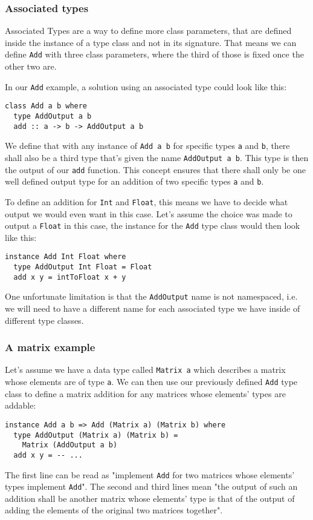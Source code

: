 
\subsubsection{Associated types}

Associated Types are a way to define more class parameters, that are defined inside the instance of a type class and not in its signature. That means we can define \verb|Add| with three class parameters, where the third of those is fixed once the other two are.

In our \verb|Add| example, a solution using an associated type could look like this:
\begin{verbatim}
class Add a b where
  type AddOutput a b
  add :: a -> b -> AddOutput a b
\end{verbatim}
We define that with any instance of \verb|Add a b| for specific types \verb|a| and \verb|b|, there shall also be a third type that's given the name \verb|AddOutput a b|. This type is then the output of our \verb|add| function. This concept ensures that there shall only be one well defined output type for an addition of two specific types \verb|a| and \verb|b|.

To define an addition for \verb|Int| and \verb|Float|, this means we have to decide what output we would even want in this case. Let's assume the choice was made to output a \verb|Float| in this case, the instance for the \verb|Add| type class would then look like this:
\begin{verbatim}
instance Add Int Float where
  type AddOutput Int Float = Float
  add x y = intToFloat x + y
\end{verbatim}
One unfortunate limitation is that the \verb|AddOutput| name is not namespaced, i.e. we will need to have a different name for each associated type we have inside of different type classes.

\subsubsection{A matrix example}\label{haskell-matrix}

Let's assume we have a data type called \verb|Matrix a| which describes a matrix whose elements are of type \verb|a|. We can then use our previously defined \verb|Add| type class to define a matrix addition for any matrices whose elements' types are addable:
\begin{verbatim}
instance Add a b => Add (Matrix a) (Matrix b) where
  type AddOutput (Matrix a) (Matrix b) =
    Matrix (AddOutput a b)
  add x y = -- ...
\end{verbatim}
The first line can be read as "implement \verb|Add| for two matrices whose elements' types implement \verb|Add|". The second and third lines mean "the output of such an addition shall be another matrix whose elements' type is that of the output of adding the elements of the original two matrices together".

